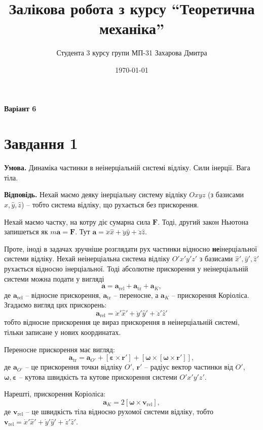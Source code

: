 \documentclass[14pt]{extarticle}
\title{Залікова робота з курсу ``Теоретична механіка''}
\author{Студента 3 курсу групи МП-31 Захарова Дмитра}
\date{\today}
\begin{document}
\maketitle

\begin{center}
\textbf{Варіант 6}
\end{center}

\section*{Завдання 1} 

\textbf{Умова.} Динаміка частинки в неінерціальній системі відліку. Сили інерції. Вага тіла.

\textbf{Відповідь.} Нехай маємо деяку інерціальну систему відліку $Oxyz$ (з базисами $\hat{x},\hat{y},\hat{z}$) -- тобто система відліку, що рухається без прискорення.

Нехай маємо частку, на котру діє сумарна сила $\mathbf{F}$. Тоді, другий закон Ньютона запишеться як $m\mathbf{a}=\mathbf{F}$. Тут $\mathbf{a}=\ddot{x}\hat{x}+\ddot{y}\hat{y}+\ddot{z}\hat{z}$.

Проте, іноді в задачах зручніше розглядати рух частинки відносно \textbf{не}інерціальної системи відліку. Нехай неінерціальна система відліку $O'x'y'z'$ з базисами $\hat{x}',\hat{y}',\hat{z}'$ рухається відносно інерціальної. Тоді абсолютне прискорення у неінерціальній системи можна подати у вигляді
\[
\mathbf{a} = \mathbf{a}_{\text{rel}} + \mathbf{a}_{\text{tr}} + \mathbf{a}_{K},
\]
де $\mathbf{a}_{\text{rel}}$ -- відносне прискорення, $\mathbf{a}_{\text{tr}}$ -- переносне, а $\mathbf{a}_K$ -- прискорення Коріоліса. Згадаємо вигляд цих прискорень:
\[
\mathbf{a}_{\text{rel}} = \ddot{x}'\hat{x}'+\ddot{y}'\hat{y}'+\ddot{z}'\hat{z}'
\]
тобто відносне прискорення це вираз прискорення в неінерціальній системі, тільки записане у нових координатах.

Переносне прискорення має вигляд:
\[
\mathbf{a}_{\text{tr}} = \mathbf{a}_{O'} + [\boldsymbol{\varepsilon} \times \mathbf{r}'] + [\boldsymbol{\omega} \times [\boldsymbol{\omega} \times \mathbf{r}']], 
\]
де $\mathbf{a}_{O'}$ -- це прискорення точки відліку $O'$, $\mathbf{r}'$ -- радіус вектор частинки від $O'$, $\boldsymbol{\omega},\boldsymbol{\varepsilon}$ -- кутова швидкість та кутове прискорення системи $O'x'y'z'$.

Нарешті, прискорення Коріоліса:
\[
\mathbf{a}_K = 2[\boldsymbol{\omega} \times \mathbf{v}_{\text{rel}}],
\]
де $\mathbf{v}_{\text{rel}}$ -- це швидкість тіла відносно рухомої системи відліку, тобто $\mathbf{v}_{\text{rel}}=\dot{x}'\hat{x}'+\dot{y}'\hat{y}'+\dot{z}'\hat{z}'$. 
\end{document}
